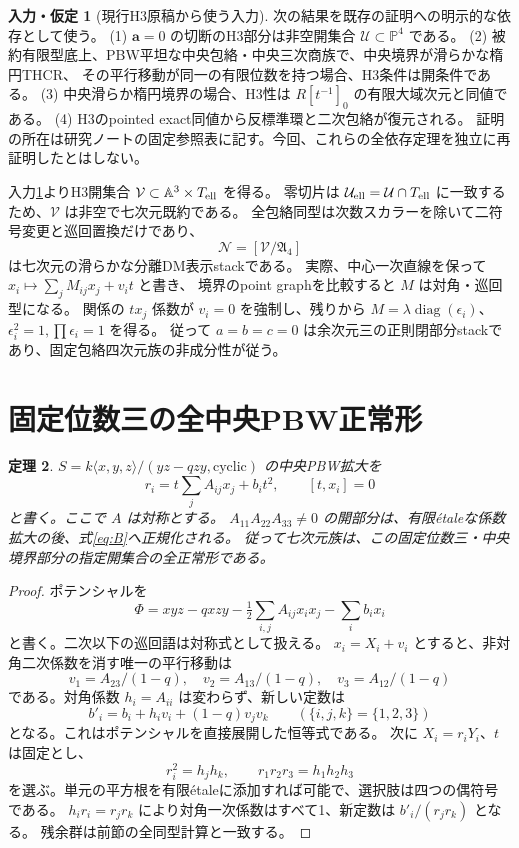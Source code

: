 \documentclass[11pt,a4paper]{ltjsarticle}
\newtheorem{theorem}{定理}[section]
\theoremstyle{definition}\newtheorem{definition}[theorem]{定義}
\newtheorem{assumption}[theorem]{入力・仮定}
\theoremstyle{remark}\newtheorem{remark}[theorem]{注意}
\renewcommand{\AA}{\mathbb A}
\newcommand{\PP}{\mathbb P}
\begin{document}
\begin{assumption}[現行H3原稿から使う入力]\label{ass:recognition}
次の結果を既存の証明への明示的な依存として使う。
(1) $\mathbf a=0$ の切断のH3部分は非空開集合 $\mathcal U\subset\PP^4$ である。
(2) 被約有限型底上、PBW平坦な中央包絡・中央三次商族で、中央境界が滑らかな楕円THCR、
その平行移動が同一の有限位数を持つ場合、H3条件は開条件である。
(3) 中央滑らか楕円境界の場合、H3性は $R[t^{-1}]_0$ の有限大域次元と同値である。
(4) H3のpointed exact同値から反標準環と二次包絡が復元される。
証明の所在は研究ノートの固定参照表に記す。今回、これらの全依存定理を独立に再証明したとはしない。
\end{assumption}

入力\ref{ass:recognition}よりH3開集合 $\mathcal V\subset\AA^3\times T_{\rm ell}$ を得る。
零切片は $\mathcal U_{\rm ell}=\mathcal U\cap T_{\rm ell}$ に一致するため、$\mathcal V$ は非空で七次元既約である。
全包絡同型は次数スカラーを除いて二符号変更と巡回置換だけであり、
\begin{equation}\label{eq:N}
\mathcal N=[\mathcal V/\mathfrak A_4]
\end{equation}
は七次元の滑らかな分離DM表示stackである。
実際、中心一次直線を保って $x_i\mapsto\sum_jM_{ij}x_j+v_it$ と書き、
境界のpoint graphを比較すると $M$ は対角・巡回型になる。
関係の $tx_j$ 係数が $v_i=0$ を強制し、残りから
$M=\lambda\operatorname{diag}(\epsilon_i)$、$\epsilon_i^2=1,\prod\epsilon_i=1$ を得る。
従って $a=b=c=0$ は余次元三の正則閉部分stackであり、固定包絡四次元族の非成分性が従う。

\section{固定位数三の全中央PBW正常形}\label{sec:normal}
\begin{theorem}\label{thm:normal}
$S=k\langle x,y,z\rangle/(yz-qzy,\mathrm{cyclic})$ の中央PBW拡大を
\[
r_i=t\sum_jA_{ij}x_j+b_it^2,\qquad [t,x_i]=0
\]
と書く。ここで $A$ は対称とする。
$A_{11}A_{22}A_{33}\ne0$ の開部分は、有限\'{e}taleな係数拡大の後、式\eqref{eq:B}へ正規化される。
従って七次元族は、この固定位数三・中央境界部分の指定開集合の全正常形である。
\end{theorem}
\begin{proof}
ポテンシャルを
\[
\Phi=xyz-qxzy-\tfrac12\sum_{i,j}A_{ij}x_ix_j-\sum_i b_ix_i
\]
と書く。二次以下の巡回語は対称式として扱える。
$x_i=X_i+v_i$ とすると、非対角二次係数を消す唯一の平行移動は
\[
v_1=A_{23}/(1-q),\quad v_2=A_{13}/(1-q),\quad v_3=A_{12}/(1-q)
\]
である。対角係数 $h_i=A_{ii}$ は変わらず、新しい定数は
\[
b'_i=b_i+h_iv_i+(1-q)v_jv_k\qquad(\{i,j,k\}=\{1,2,3\})
\]
となる。これはポテンシャルを直接展開した恒等式である。
次に $X_i=r_iY_i$、$t$ は固定とし、
\[
r_i^2=h_jh_k,\qquad r_1r_2r_3=h_1h_2h_3
\]
を選ぶ。単元の平方根を有限\'{e}taleに添加すれば可能で、選択肢は四つの偶符号である。
$h_ir_i=r_jr_k$ により対角一次係数はすべて1、新定数は $b'_i/(r_jr_k)$ となる。
残余群は前節の全同型計算と一致する。
\end{proof}
\end{document}
